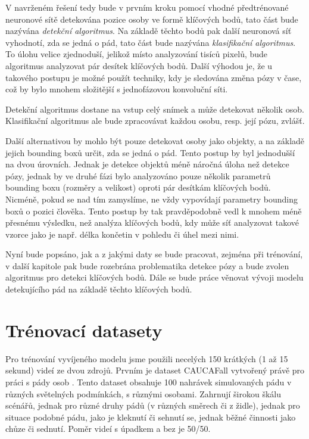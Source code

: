 V navrženém řešení tedy bude v prvním kroku pomocí vhodné předtrénované
neuronové sítě detekována pozice osoby ve formě klíčových bodů, tato část bude
nazývána \textit{detekční algoritmus}. Na základě těchto bodů pak další
neuronová síť vyhodnotí, zda se jedná o pád, tato část bude nazývána
\textit{klasifikační algoritmus}. To úlohu velice zjednoduší, jelikož místo
analyzování tisíců pixelů, bude algoritmus analyzovat pár desítek klíčových
bodů. Další výhodou je, že u takového postupu je možné použít techniky, kdy je
sledována změna pózy v čase, což by bylo mnohem složitější s jednofázovou
konvoluční síti.

Detekční algoritmus dostane na vstup celý snímek a může detekovat několik osob.
Klasifikační algoritmus ale bude zpracovávat každou osobu, resp. její pózu,
zvlášť.

Další alternativou by mohlo být pouze detekovat osoby jako objekty, a na
základě jejich bounding boxů určit, zda se jedná o pád. Tento postup by byl
jednodušší na dvou úrovních. Jednak je detekce objektů méně náročná úloha než
detekce pózy, jednak by ve druhé fázi bylo analyzováno pouze několik parametrů
bounding boxu (rozměry a velikost) oproti pár desítkám klíčových bodů. Nicméně,
pokud se nad tím zamyslíme, ne vždy vypovídají parametry bounding boxů o pozici
člověka. Tento postup by tak pravděpodobně vedl k mnohem méně přesnému
výsledku, než analýza klíčových bodů, kdy může síť analyzovat takové vzorce
jako je např. délka končetin v pohledu či úhel mezi nimi.

Nyní bude popsáno, jak a z jakými daty se bude pracovat, zejména při trénování,
v další kapitole pak bude rozebrána problematika detekce pózy a bude zvolen
algoritmus pro detekci klíčových bodů. Dále se bude práce věnovat vývoji modelu
detekujícího pád na základě těchto klíčových bodů.

\section{Trénovací datasety}
\label{sec:TrainingData}

Pro trénování vyvíjeného modelu jsme použili necelých 150 krátkých (1 až 15
sekund) videí ze dvou zdrojů. Prvním je dataset CAUCAFall vytvořený právě pro
práci s pády osob \cite{caucafall}. Tento dataset obsahuje 100 nahrávek
simulovaných pádu v různých světelných podmínkách, s různými osobami. Zahrnují
širokou škálu scénářů, jednak pro různé druhy pádů (v různých směrech či z
židle), jednak pro situace podobné pádu, jako je kleknutí či sehnutí se, jednak
běžné činnosti jako chůze či sednutí. Poměr videí s úpadkem a bez je 50/50.

